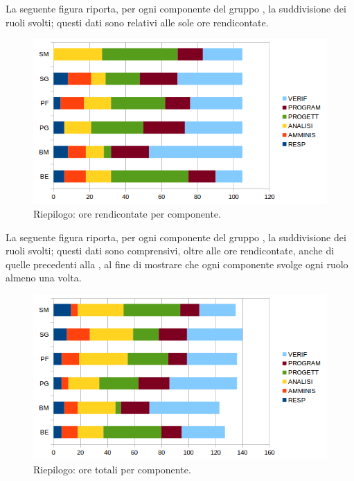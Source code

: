 \documentclass[../PianoDiProgetto.tex]{subfiles}
\begin{document}
		La seguente figura riporta, per ogni componente del gruppo \kaleidoscode, la suddivisione dei ruoli svolti; questi dati sono relativi alle sole ore rendicontate.
		\begin{figure}[H]
			\centering
			\includegraphics[scale=0.7]{Figures/OreComponenteRiepilogoRend.png}
			\caption{Riepilogo: ore rendicontate per componente.}\label{fig:15}
		\end{figure}
	\newpage
	La seguente figura riporta, per ogni componente del gruppo \kaleidoscode, la suddivisione dei ruoli svolti; questi dati sono comprensivi, oltre alle ore rendicontate, anche di quelle precedenti alla \revisionedeirequisiti, al fine di mostrare che ogni componente svolge ogni ruolo almeno una volta.
		\begin{figure}[H]
			\centering
			\includegraphics[scale=0.7]{Figures/OreComponenteRiepilogoTot.png}
			\caption{Riepilogo: ore totali per componente.}\label{fig:15}
		\end{figure}
\end{document}
